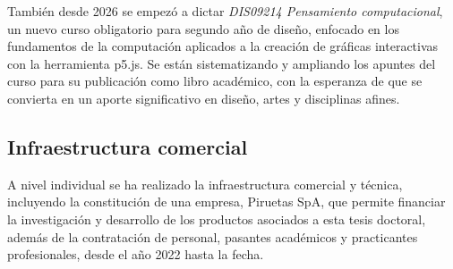\documentclass[../proyecto.tex]{subfiles}
\begin{document}
También desde 2026 se empezó a dictar \textit{DIS09214 Pensamiento computacional}, un nuevo curso obligatorio para segundo año de diseño, enfocado en los fundamentos de la computación aplicados a la creación de gráficas interactivas con la herramienta p5.js. Se están sistematizando y ampliando los apuntes del curso para su publicación como libro académico, con la esperanza de que se convierta en un aporte significativo en diseño, artes y disciplinas afines.

\subsection{Infraestructura comercial}

A nivel individual se ha realizado la infraestructura comercial y técnica, incluyendo la constitución de una empresa, Piruetas SpA, que permite financiar la investigación y desarrollo de los productos asociados a esta tesis doctoral, además de la contratación de personal, pasantes académicos y practicantes profesionales, desde el año 2022 hasta la fecha.
\end{document}
